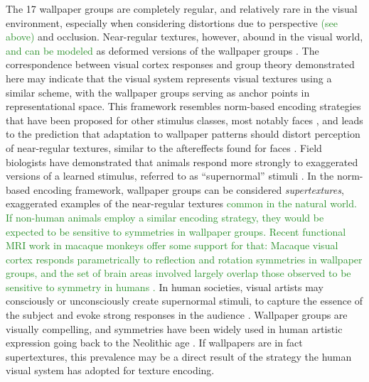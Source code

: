 \documentclass[11pt, twoside]{article}
\begin{document}
The 17 wallpaper groups are completely regular, and relatively rare in the visual environment, especially when considering distortions due to perspective \textcolor{ForestGreen}{(see above)} and occlusion. Near-regular textures, however, abound in the visual world, \textcolor{ForestGreen}{and can be modeled} as deformed versions of the wallpaper groups \citep{RN1519}. The correspondence between visual cortex responses and group theory demonstrated here may indicate that the visual system represents visual textures using a similar scheme, with the wallpaper groups serving as anchor points in representational space. This framework resembles norm-based encoding strategies that have been proposed for other stimulus classes, most notably faces \citep{RN435}, and leads to the prediction that adaptation to wallpaper patterns should distort perception of near-regular textures, similar to the aftereffects found for faces \citep{RN1768}. Field biologists have demonstrated that animals respond more strongly to exaggerated versions of a learned stimulus, referred to as “supernormal” stimuli \citep{RN1775}. In the norm-based encoding framework, wallpaper groups can be considered \textit{supertextures}, exaggerated examples of the near-regular textures \textcolor{ForestGreen}{common in the natural world. If non-human animals employ a similar encoding strategy, they would be expected to be sensitive to symmetries in wallpaper groups. Recent functional MRI work in macaque monkeys offer some support for that: Macaque visual cortex responds parametrically to reflection and rotation symmetries in wallpaper groups, and the set of brain areas involved largely overlap those observed to be sensitive to symmetry in humans \citep{audurier_symmetry_2021}.} In human societies, visual artists may consciously or unconsciously create supernormal stimuli, to capture the essence of the subject and evoke strong responses in the audience \citep{RN1764}. Wallpaper groups are visually compelling, and symmetries have been widely used in human artistic expression going back to the Neolithic age \citep{RN1949}. If wallpapers are in fact supertextures, this prevalence may be a direct result of the strategy the human visual system has adopted for texture encoding. 
\end{document}

